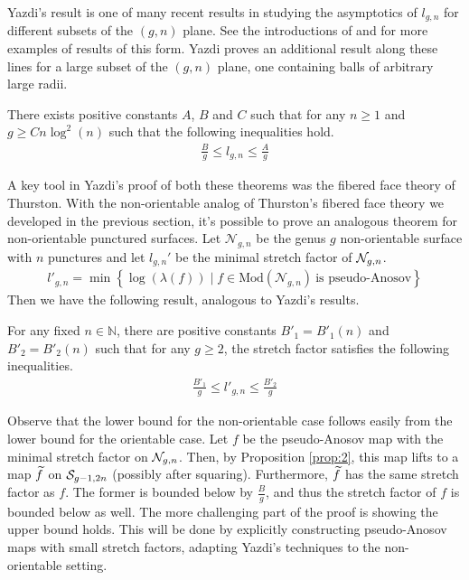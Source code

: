 Yazdi's result is one of many recent results in studying the asymptotics of $l_{g,n}$ for different subsets of
the $(g,n)$ plane. See the introductions of \cite{yazdi2018pseudo} and \cite{tsai2009asymptotic} for more
examples of results of this form. Yazdi proves an additional result along these lines for a large subset of
the $(g,n)$ plane, one containing balls of arbitrary large radii.

\begin{thm}[Yazdi]
    \label{thm:yazdi2}
    There exists positive constants $A$, $B$ and $C$ such that for any $n \geq 1$ and $g \geq Cn\log^2(n)$ such that
    the following inequalities hold.
    \begin{align*}
        \frac{B}{g} \leq l_{g,n} \leq \frac{A}{g}
    \end{align*}

\end{thm}
A key tool in Yazdi's proof of both these theorems was the fibered face theory of Thurston. With the non-orientable analog of
Thurston's fibered face theory we developed in the previous section, it's possible to prove an analogous
theorem for non-orientable punctured surfaces.  Let $\mathcal{N}_{g,n}$ be the genus $g$ non-orientable
surface with $n$ punctures and let $l_{g,n}'$ be the minimal stretch factor of $\mathcal{N}_{g,n}$.
\begin{align*}
  l'_{g,n} = \min\left\{\log(\lambda(f)) \mid f \in \text{Mod}(\mathcal{N}_{g,n})\ \text{is pseudo-Anosov}\right\}
\end{align*}
Then we have the following result, analogous to Yazdi's results.
\begin{thm}
  \label{thm:stretch1}
  For any fixed $n \in \mathbb{N}$, there are positive constants $B'_1 = B'_1(n)$ and $B'_2 = B'_2(n)$ such that
  for any $g \geq 2$, the stretch factor satisfies the following inequalities.
  \begin{align*}
    \frac{B'_1}{g} \leq l'_{g,n} \leq \frac{B'_2}{g}
  \end{align*}
\end{thm}

Observe that the lower bound for the non-orientable case follows easily from the lower bound for the orientable case.
Let $f$ be the pseudo-Anosov map with the minimal stretch factor on $\mathcal{N}_{g,n}$. Then, by Proposition \ref{prop:2},
this map lifts to a map $\widetilde{f}$ on $\mathcal{S}_{g-1, 2n}$ (possibly after squaring). Furthermore, $\widetilde{f}$ has the same
stretch factor as $f$. The former is bounded below by $\frac{B}{g}$, and thus the stretch factor of $f$ is bounded
below as well. The more challenging part of the proof is showing the upper bound holds. This will be done by explicitly
constructing pseudo-Anosov maps with small stretch factors, adapting Yazdi's techniques to the non-orientable setting.

